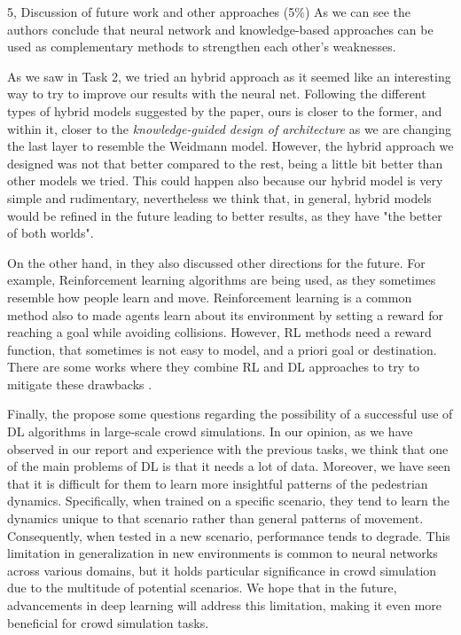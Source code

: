 \begin{task}{5, Discussion of future work and other approaches (5\%)}
As we can see the authors conclude that neural network and knowledge-based approaches can be used as complementary methods to strengthen each other's weaknesses.

As we saw in Task 2, we tried an hybrid approach as it seemed like an interesting way to try to improve our results with the neural net. Following the different types of hybrid models suggested by the paper, ours is closer to the former, and within it, closer to the \textit{knowledge-guided design of architecture} as we are changing the last layer to resemble the Weidmann model. However, the hybrid approach we designed was not that better compared to the rest, being a little bit better than other models we tried. This could happen also because our hybrid model is very simple and rudimentary, nevertheless we think that, in general, hybrid models would be refined in the future leading to better results, as they have "the better of both worlds".

On the other hand, in \cite{korbmacher2022review} they also discussed other directions for the future. For example, Reinforcement learning algorithms are being used, as they sometimes resemble how people learn and move. Reinforcement learning is a common method also to made agents learn about its environment by setting a reward for reaching a goal while avoiding collisions. However, RL methods need a reward function, that sometimes is not easy to model, and a priori goal or destination. There are some works where they combine RL and DL approaches to try to mitigate these drawbacks \cite{everett2021collision}.

Finally, the propose some questions regarding the possibility of a successful use of DL algorithms in large-scale crowd simulations. In our opinion, as we have observed in our report and experience with the previous tasks, we think that one of the main problems of DL is that it needs a lot of data. Moreover, we have seen that it is difficult for them to learn more insightful patterns of the pedestrian dynamics. Specifically, when trained on a specific scenario, they tend to learn the dynamics unique to that scenario rather than general patterns of movement. Consequently, when tested in a new scenario, performance tends to degrade. This limitation in generalization in new environments is common to neural networks across various domains, but it holds particular significance in crowd simulation due to the multitude of potential scenarios. We hope that in the future, advancements in deep learning will address this limitation, making it even more beneficial for crowd simulation tasks.
\end{task}